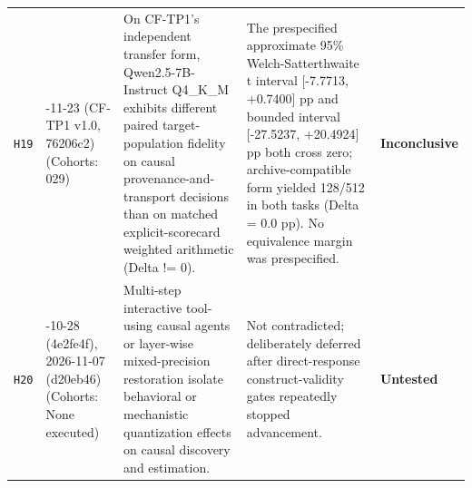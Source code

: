 {\begin{longtable}{@{}>{\raggedright\arraybackslash}p{0.9cm}>{\raggedright\arraybackslash}p{1.9cm}>{\raggedright\arraybackslash}p{4.3cm}>{\raggedright\arraybackslash}p{4.6cm}>{\raggedright\arraybackslash}p{2.7cm}@{}}
\texttt{H19} & 2026-\allowbreak{}11-\allowbreak{}23 (CF-\allowbreak{}TP1 v1.0, 76206c2) (Cohorts: 029) & On CF-\allowbreak{}TP1's independent transfer form, Qwen2.5-\allowbreak{}7B-\allowbreak{}Instruct Q4\_K\_M exhibits different paired target-\allowbreak{}population fidelity on causal provenance-\allowbreak{}and-\allowbreak{}transport decisions than on matched explicit-\allowbreak{}scorecard weighted arithmetic (Delta != 0). & The prespecified approximate 95\% Welch-\allowbreak{}Satterthwaite t interval [-\allowbreak{}7.7713, +0.7400] pp and bounded interval [-\allowbreak{}27.5237, +20.4924] pp both cross zero; archive-\allowbreak{}compatible form yielded 128/\allowbreak{}512 in both tasks (Delta = 0.0 pp). No equivalence margin was prespecified. & \textbf{Inconclusive} \\[2pt]
\texttt{H20} & 2026-\allowbreak{}10-\allowbreak{}28 (4e2fe4f), 2026-\allowbreak{}11-\allowbreak{}07 (d20eb46) (Cohorts: None executed) & Multi-\allowbreak{}step interactive tool-\allowbreak{}using causal agents or layer-\allowbreak{}wise mixed-\allowbreak{}precision restoration isolate behavioral or mechanistic quantization effects on causal discovery and estimation. & Not contradicted; deliberately deferred after direct-\allowbreak{}response construct-\allowbreak{}validity gates repeatedly stopped advancement. & \textbf{Untested} \\[2pt]
\end{longtable}
}
